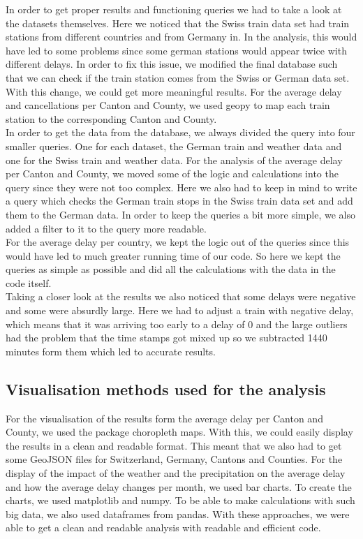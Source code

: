 In order to get proper results and functioning queries we had to take a look at the datasets themselves.
Here we noticed that the Swiss train data set had train stations from different countries and from Germany in.
In the analysis, this would have led to some problems since some german stations would appear twice with different delays.
In order to fix this issue, we modified the final database such that we can check if the train station comes from the Swiss or German data set.
With this change, we could get more meaningful results.
For the average delay and cancellations per Canton and County, we used geopy to map each train station to the corresponding Canton and County.\\
In order to get the data from the database, we always divided the query into four smaller queries.
One for each dataset, the German train and weather data and one for the Swiss train and weather data.
For the analysis of the average delay per Canton and County, we moved some of the logic and calculations into the query since they were not too complex.
Here we also had to keep in mind to write a query which checks the German train stops in the Swiss train data set and add them to the German data.
In order to keep the queries a bit more simple, we also added a filter to it to the query more readable.\\
For the average delay per country, we kept the logic out of the queries since this would have led to much greater running time of our code.
So here we kept the queries as simple as possible and did all the calculations with the data in the code itself.\\
Taking a closer look at the results we also noticed that some delays were negative and some were absurdly large.
Here we had to adjust a train with negative delay, which means that it was arriving too early to a delay of 0 and
the large outliers had the problem that the time stamps got mixed up so we subtracted 1440 minutes form them which led to accurate results.

\subsection*{Visualisation methods used for the analysis}

For the visualisation of the results form the average delay per Canton and County, we used the package choropleth maps.
With this, we could easily display the results in a clean and readable format.
This meant that we also had to get some
GeoJSON files for Switzerland, Germany, Cantons and Counties.
For the display of the impact of the weather and the precipitation on the average delay and how the average delay changes per month,
we used bar charts. To create the charts, we used matplotlib and numpy.
To be able to make calculations with such big data, we also used dataframes from pandas.
With these approaches, we were able to get a clean and readable analysis with readable and efficient code.

